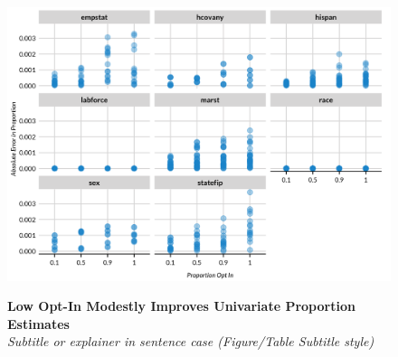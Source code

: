 \documentclass[
]{urban-formatting}
\begin{document}
\begin{figure}[htbp]
    \caption{
    \textbf{Low Opt-In Modestly Improves Univariate Proportion Estimates}\\
    \textit{Subtitle or explainer in sentence case (Figure/Table Subtitle style)}
    }
    \centering
    \includegraphics[width=6.5in]{../analysis/figures/proportions-1.png}
    \label{fig:proportions}
\end{figure}
\begin{singlespace}
    \\
\end{singlespace}
\end{document}
